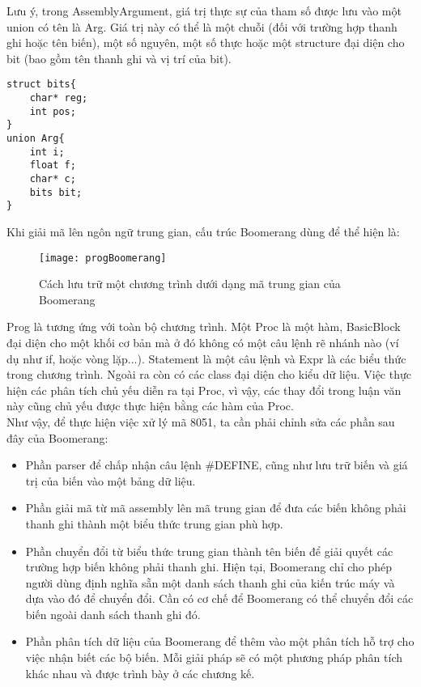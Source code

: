 Lưu ý, trong AssemblyArgument, giá trị thực sự của tham số được lưu vào một union có tên là Arg. Giá trị này có thể là một chuỗi (đối với trường hợp thanh ghi hoặc tên biến), một số nguyên, một số thực hoặc một structure đại diện cho bit (bao gồm tên thanh ghi và vị trí của bit).
\begin{lstlisting}[caption={Đoạn mã mô tả cách biểu diễn giá trị của tham số trong Boomerang}, label={}]
struct bits{
	char* reg;
	int pos;
}
union Arg{
	int i;
	float f;
	char* c;
	bits bit;
}
\end{lstlisting}

Khi giải mã lên ngôn ngữ trung gian, cấu trúc Boomerang dùng để thể hiện là:

\begin{figure}
	\centering
	\texttt{[image: progBoomerang]}
	\caption{Cách lưu trữ một chương trình dưới dạng mã trung gian của Boomerang}
	\label{fig:progboomerang}
\end{figure}


Prog là tương ứng với toàn bộ chương trình. Một Proc là một hàm, BasicBlock đại diện cho một khối cơ bản mà ở đó không có một câu lệnh rẽ nhánh nào (ví dụ như if, hoặc vòng lặp...). Statement là một câu lệnh và Expr là các biểu thức trong chương trình. Ngoài ra còn có các class đại diện cho kiểu dữ liệu. Việc thực hiện các phân tích chủ yếu diễn ra tại Proc, vì vậy, các thay đổi trong luận văn này cũng chủ yếu được thực hiện bằng các hàm của Proc.\\

Như vậy, để thực hiện việc xử lý mã 8051, ta cần phải chỉnh sửa các phần sau đây của Boomerang:
\begin{itemize}
	\item Phần parser để chấp nhận câu lệnh \#DEFINE, cũng như lưu trữ biến và giá trị của biến vào một bảng dữ liệu.
	\item Phần giải mã từ mã assembly lên mã trung gian để đưa các biến không phải thanh ghi thành một biểu thức trung gian phù hợp.
	\item Phần chuyển đổi từ biểu thức trung gian thành tên biến để giải quyết các trường hợp biến không phải thanh ghi. Hiện tại, Boomerang chỉ cho phép người dùng định nghĩa sẵn một danh sách thanh ghi của kiến trúc máy và dựa vào đó để chuyển đổi. Cần có cơ chế để Boomerang có thể chuyển đổi các biến ngoài danh sách thanh ghi đó.
	\item Phần phân tích dữ liệu của Boomerang để thêm vào một phân tích hỗ trợ cho việc nhận biết các bộ biến. Mỗi giải pháp sẽ có một phương pháp phân tích khác nhau và được trình bày ở các chương kế.
\end{itemize}
